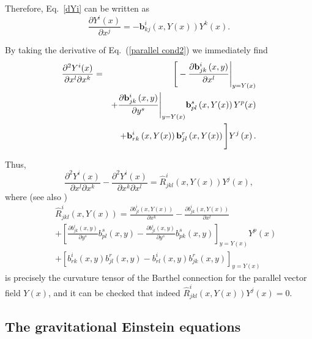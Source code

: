 \documentclass[aps,superscriptaddress, showpacs,preprintnumbers, superscriptaddress, nofootinbibt,twocolumn]{revtex4-2}
\def\bea{\begin{eqnarray}}
\def\eea{\end{eqnarray}}
\begin{document}
Therefore, Eq.~\eqref{dYi} can be written as
\begin{equation}\label{parallel cond2}
\frac{\partial Y^{i}(x)}{\partial x^{j}}=
-\mathbf{b}_{kj}^{i}
( x,Y(x)) Y^{k}(x).  %
\end{equation}

By taking the derivative of Eq.~(\ref{parallel cond2}) we immediately find
\begin{eqnarray}
\frac{\partial ^{2}Y^{i}(x)}{\partial x^{l}\partial x^{k}}&=&\Bigg[ -\frac{%
\partial \mathbf{b}_{jk}^{i}\left( x,y\right) }{\partial x^{l}}\Bigg|_{y=Y(x)}  \notag \\
&&+\frac{\partial \mathbf{b}_{jk}^{i}\left( x,y\right) }{\partial y^{s}}\Bigg|_{y=Y(x)}%
\mathbf{b}_{pl}^{s}\left( x,Y(x)\right) Y^{p}(x)  \notag \\
&&+\mathbf{b}_{rk}^{i}\left( x,Y(x)\right) \mathbf{b}_{jl}^{r}\left( x,Y(x)\right) \Bigg] %
Y^{j}\left( x\right) .
\end{eqnarray}

Thus,
\begin{equation}
\frac{\partial ^{2}Y^{i}(x)}{\partial x^{l}\partial x^{k}}-\frac{\partial
^{2}Y^{i}(x)}{\partial x^{k}\partial x^{l}}=\hat{R}_{jkl}^{i}\left(
x,Y\left( x\right) \right) Y^{j}\left( x\right) ,
\end{equation}%
where (see also \cite{Ing2a})
\bea\label{eq25}
&&\hat{R}_{jkl}^{i}\left( x,Y\left( x\right) \right) =\frac{\partial b_{jl}^{i}\left( x,Y(x)\right) }{\partial x^{k}}-\frac{\partial
  b_{jk}^{i}\left( x,Y(x)\right) }{\partial x^{l}}\nonumber\\
&&+
\left[ \frac{\partial
b_{jk}^{i}\left( x,y\right) }{\partial y^{s}}b_{pl}^{s}\left(
x,y\right) -\frac{\partial b_{jl}^{i}\left( x,y\right) }{\partial y^{s}%
}b_{pk}^{s}\left( x,y\right) \right]_{y=Y(x)}
Y^{p}(x)\nonumber\\
&&+\left[b_{rk}^{i}\left(
x,y\right) b_{jl}^{r}\left( x,y\right) -b_{rl}^{i}\left( x,y\right)
b_{jk}^{r}\left( x,y\right)\right]_{y=Y(x)}
\eea
is precisely the curvature tensor of the Barthel connection for the parallel
vector field $Y(x)$, and  it can be checked that indeed $\hat{R}_{jkl}^{i}\left(x,Y\left( x\right) \right) Y^{j}\left( x\right)=0$.

\subsection{The gravitational Einstein equations}
\end{document}
